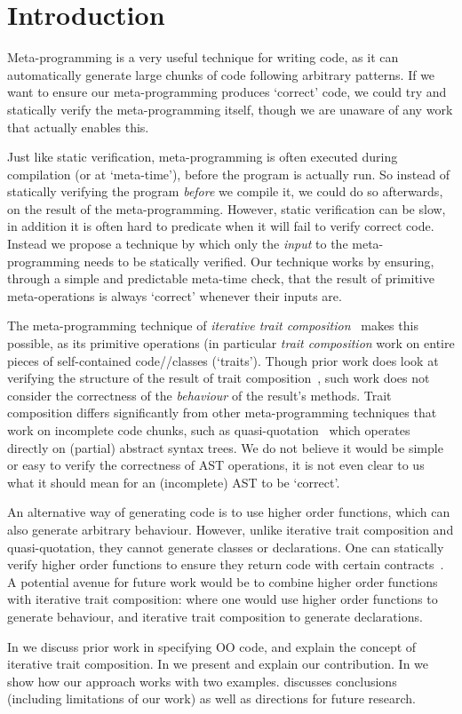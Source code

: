 \section{Introduction}
Meta-programming is a very useful technique for writing code, as it can automatically generate large chunks of code following arbitrary patterns. If we want to ensure our meta-programming produces `correct' code, we could try and statically verify the meta-programming itself, though we are unaware of any work that actually enables this. 

Just like static verification, meta-programming is often executed during compilation (or at `meta-time'), before the program is actually run. So instead of statically verifying the program \emph{before} we compile it, we could do so afterwards, on the result of the meta-programming. However, static verification can be slow, in addition it is often hard to predicate when it will fail to verify correct code. Instead we propose a technique by which only the \emph{input} to the meta-programming needs to be statically verified. Our technique works by ensuring, through a simple and predictable meta-time check, that the result of primitive meta-operations is always `correct' whenever their inputs are.

The meta-programming technique of \emph{iterative trait composition}~\cite{Servetto:2013:MLA:2426890.2426913} makes this possible, as its primitive operations (in particular \emph{trait composition} work on entire pieces of self-contained code//classes (`traits'). Though prior work does look at verifying the structure of the result of trait composition~\cite{Damiani:2011:VTP:2076674.2076682}, such work does not consider the correctness of the \emph{behaviour} of the result's methods. Trait composition differs significantly from other meta-programming techniques that work on incomplete code chunks, such as quasi-quotation~\cite{sheard2002template} which operates directly on (partial) abstract syntax trees. We do not believe it would be simple or easy to verify the correctness of AST operations, it is not even clear to us what it should mean for an (incomplete) AST to be `correct'.

An alternative way of generating code is to use higher order functions, which can also generate arbitrary behaviour. However, unlike iterative trait composition and quasi-quotation, they cannot generate classes or declarations. One can statically verify higher order functions to ensure they return code with certain contracts~\cite{Xu:2009:SCC:1480881.1480889}. A potential avenue for future work would be to combine higher order functions with iterative trait composition: where one would use higher order functions to generate behaviour, and iterative trait composition to generate declarations.

In  we discuss prior work in specifying OO code, and explain the concept of iterative trait composition. In  we present and explain our contribution. In  we show how our approach works with two examples.  discusses conclusions (including limitations of our work) as well as directions for future research.